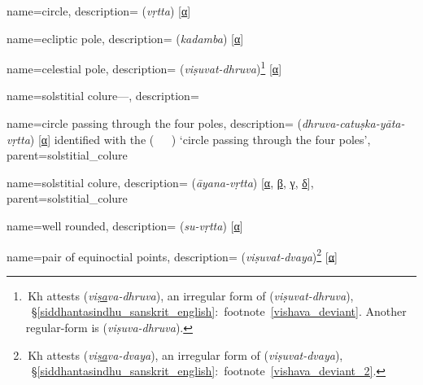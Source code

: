 {
        name={circle},
        description={ (\textit{vṛtta}) [\hyperlink{SEpassA}{α}]}
}

{
        name={ecliptic pole},
        description={ (\textit{kadamba}) [\hyperlink{SEpassA}{α}]}
}

{
        name={celestial pole},
        description={ (\textit{viṣuvat-dhruva})\footnote{\,Kh attests  (\textit{vi\underline{ṣa}va-dhruva}), an irregular form
        of  (\textit{viṣuvat-dhruva}), \vid\ \S\thinspace\ref{siddhantasindhu_sanskrit_english}:~footnote~\ref{vishava_deviant}. Another \acrshort{regular}-form is  (\textit{viṣuva-dhruva}).}  [\hyperlink{SEpassA}{α}]}
}

{
        name={solstitial colure---},
        description={\phantom{x}\nopagebreak}
}


{
        name={circle passing through the four poles},
        description={ (\textit{dhruva-catuṣka-yāta-vṛtta}) [\hyperlink{SEpassA}{α}]\newline
        identified with the  (\textit{\dayiri\idafavowel\ \marri\ \biaqtab\idafaconsonant\ \arbai}) `circle passing through the four poles'},
        parent={solstitial_colure}
}
 
{       
        name={solstitial colure},
        description={ (\textit{āyana-vṛtta}) [\hyperlink{SEpassA}{α}, \hyperlink{SEpassB}{β}, \hyperlink{SEpassC}{γ}, \hyperlink{SEpassD}{δ}]},        
        parent={solstitial_colure}
}       

{
        name={well rounded},
        description={ (\textit{su-vṛtta}) [\hyperlink{SEpassA}{α}]}
}

{
        name={pair of equinoctial points},
        description={ (\textit{viṣuvat-dvaya})\footnote{\,Kh attests  (\textit{vi\underline{ṣa}va-dvaya}), an irregular form of  (\textit{viṣuvat-dvaya}), \vid\ \S\thinspace\ref{siddhantasindhu_sanskrit_english}:~footnote~\ref{vishava_deviant_2}.} [\hyperlink{SEpassA}{α}]}
}


